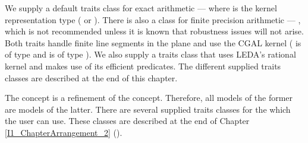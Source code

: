 We supply a default traits class for exact arithmetic ---
where  is the kernel representation type
( or ).  There is also a class
for finite precision arithmetic --- ,
which is not recommended unless it is known that robustness issues will not
arise. 
Both traits handle
finite line segments in the plane
and use the CGAL kernel ( is of type 
 and  is of type
).
We also supply a traits class that uses LEDA's rational kernel and makes use
of its efficient predicates. The different supplied traits classes are described at the end of this chapter.

The  
concept is a refinement of the  concept.
Therefore, all models of the former are models of the latter. 
There are several supplied traits classes for the  which the user can use. 
These classes are described at the end of Chapter \ref{I1_ChapterArrangement_2}
().

